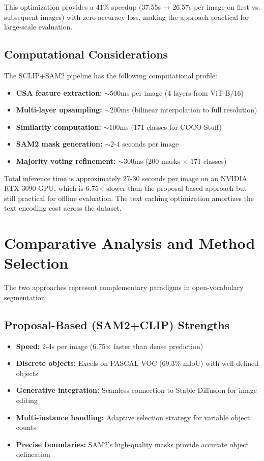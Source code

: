 This optimization provides a 41\% speedup (37.55s → 26.57s per image on first vs. subsequent images) with zero accuracy loss, making the approach practical for large-scale evaluation.

\subsection{Computational Considerations}

The SCLIP+SAM2 pipeline has the following computational profile:

\begin{itemize}
    \item \textbf{CSA feature extraction:} $\sim$500ms per image (4 layers from ViT-B/16)
    \item \textbf{Multi-layer upsampling:} $\sim$200ms (bilinear interpolation to full resolution)
    \item \textbf{Similarity computation:} $\sim$100ms (171 classes for COCO-Stuff)
    \item \textbf{SAM2 mask generation:} $\sim$2-4 seconds per image
    \item \textbf{Majority voting refinement:} $\sim$300ms (200 masks $\times$ 171 classes)
\end{itemize}

Total inference time is approximately 27-30 seconds per image on an NVIDIA RTX 3090 GPU, which is 6.75$\times$ slower than the proposal-based approach but still practical for offline evaluation. The text caching optimization amortizes the text encoding cost across the dataset.

\section{Comparative Analysis and Method Selection}

The two approaches represent complementary paradigms in open-vocabulary segmentation:

\subsection{Proposal-Based (SAM2+CLIP) Strengths}
\begin{itemize}
    \item \textbf{Speed:} 2-4s per image (6.75$\times$ faster than dense prediction)
    \item \textbf{Discrete objects:} Excels on PASCAL VOC (69.3\% mIoU) with well-defined objects
    \item \textbf{Generative integration:} Seamless connection to Stable Diffusion for image editing
    \item \textbf{Multi-instance handling:} Adaptive selection strategy for variable object counts
    \item \textbf{Precise boundaries:} SAM2's high-quality masks provide accurate object delineation
\end{itemize}

